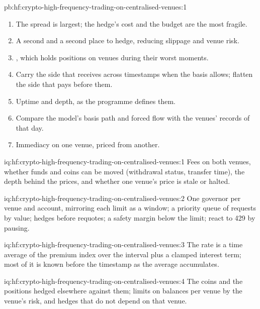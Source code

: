 \begin{solution}{pb:hf:crypto-high-frequency-trading-on-centralised-venues:1}
\begin{enumerate}
\item The spread is largest; the hedge's cost and the budget are the most fragile.
\item A second  and a second place to hedge, reducing slippage and venue risk.
\item {}, which holds positions on venues during their worst moments.
\item Carry the side that receives across timestamps when the basis allows; flatten the side that pays before them.
\item Uptime and depth, as the programme defines them.
\item Compare the model's basis path and forced flow with the venues' records of that day.
\item Immediacy on one venue, priced from another.
\end{enumerate}
\end{solution}

\begin{solution}{iq:hf:crypto-high-frequency-trading-on-centralised-venues:1}
Fees on both venues, whether funds and coins can be moved (withdrawal status, transfer time), the depth behind the prices, and whether one venue's
price is stale or halted.
\end{solution}

\begin{solution}{iq:hf:crypto-high-frequency-trading-on-centralised-venues:2}
One governor per venue and account, mirroring each limit as a window; a priority queue of requests by value; hedges before requotes; a safety
margin below the limit; react to 429 by pausing.
\end{solution}

\begin{solution}{iq:hf:crypto-high-frequency-trading-on-centralised-venues:3}
The rate is a time average of the premium index over the interval plus a clamped interest term; most of it is known before the timestamp as the
average accumulates.
\end{solution}

\begin{solution}{iq:hf:crypto-high-frequency-trading-on-centralised-venues:4}
The coins and the positions hedged elsewhere against them; limits on balances per venue by the venue's risk, and hedges that do not depend on that
venue.
\end{solution}

